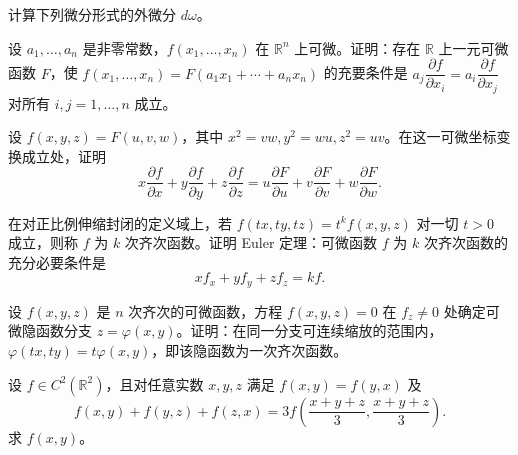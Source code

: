\noindent\begin{minipage}{\textwidth}
计算下列微分形式的外微分 $d\omega$。
\end{minipage}\par\vfill
\noindent\begin{minipage}{\textwidth}
设 $a_1,\ldots,a_n$ 是非零常数，$f(x_1,\ldots,x_n)$ 在 $\mathbb R^n$ 上可微。证明：存在 $\mathbb R$ 上一元可微函数 $F$，使 $f(x_1,\ldots,x_n)=F(a_1x_1+\cdots+a_nx_n)$ 的充要条件是 $a_j\dfrac{\partial f}{\partial x_i}=a_i\dfrac{\partial f}{\partial x_j}$ 对所有 $i,j=1,\ldots,n$ 成立。
\end{minipage}\par\vfill
\noindent\begin{minipage}{\textwidth}
设 $f(x,y,z)=F(u,v,w)$，其中 $x^2=vw, y^2=wu, z^2=uv$。在这一可微坐标变换成立处，证明\[x\frac{\partial f}{\partial x}+y\frac{\partial f}{\partial y}+z\frac{\partial f}{\partial z}=u\frac{\partial F}{\partial u}+v\frac{\partial F}{\partial v}+w\frac{\partial F}{\partial w}.\]
\end{minipage}\par\vfill
\newpage
\noindent\begin{minipage}{\textwidth}
在对正比例伸缩封闭的定义域上，若 $f(tx,ty,tz)=t^kf(x,y,z)$ 对一切 $t>0$ 成立，则称 $f$ 为 $k$ 次齐次函数。证明 Euler 定理：可微函数 $f$ 为 $k$ 次齐次函数的充分必要条件是\[x f_x+y f_y+z f_z=kf.\]
\end{minipage}\par\vfill
\noindent\begin{minipage}{\textwidth}
设 $f(x,y,z)$ 是 $n$ 次齐次的可微函数，方程 $f(x,y,z)=0$ 在 $f_z\ne0$ 处确定可微隐函数分支 $z=\varphi(x,y)$。证明：在同一分支可连续缩放的范围内，$\varphi(tx,ty)=t\varphi(x,y)$，即该隐函数为一次齐次函数。
\end{minipage}\par\vfill
\noindent\begin{minipage}{\textwidth}
设 $f\in C^2(\mathbb R^2)$，且对任意实数 $x,y,z$ 满足 $f(x,y)=f(y,x)$ 及\[f(x,y)+f(y,z)+f(z,x)=3f\!\left(\frac{x+y+z}{3},\frac{x+y+z}{3}\right).\]求 $f(x,y)$。
\end{minipage}\par\vfill
